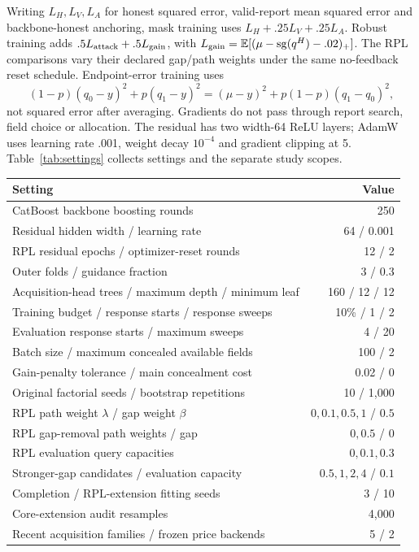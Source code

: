 \documentclass[11pt]{article}
\begin{document}
Writing $L_H,L_V,L_A$ for honest squared error, valid-report mean squared
error and backbone-honest anchoring, mask training uses
$L_H+.25L_V+.25L_A$. Robust training adds
$.5L_{\rm attack}+.5L_{\rm gain}$, with
$L_{\rm gain}=\mathbb E[(\mu-\operatorname{sg}(q^H)-.02)_+]$.
The RPL comparisons vary their declared gap/path weights under the same
no-feedback reset schedule. Endpoint-error training uses
\[
 (1-p)(q_0-y)^2+p(q_1-y)^2
 =(\mu-y)^2+p(1-p)(q_1-q_0)^2,
\]
not squared error after averaging. Gradients do not pass through report search,
field choice or allocation. The residual has two width-64 ReLU layers; AdamW
uses learning rate .001, weight decay $10^{-4}$ and gradient clipping at 5.
Table~\ref{tab:settings} collects settings and the separate study scopes.

\begin{table}[htbp]\centering\small
\begin{tabular}{lr}\toprule
Setting & Value\\\midrule
CatBoost backbone boosting rounds ~\cite{catboost} & 250\\
Residual hidden width / learning rate & 64 / 0.001\\
RPL residual epochs / optimizer-reset rounds & 12 / 2\\
Outer folds / guidance fraction & 3 / 0.3\\
Acquisition-head trees / maximum depth / minimum leaf & 160 / 12 / 12\\
Training budget / response starts / response sweeps & 10\% / 1 / 2\\
Evaluation response starts / maximum sweeps & 4 / 20\\
Batch size / maximum concealed available fields & 100 / 2\\
Gain-penalty tolerance / main concealment cost & 0.02 / 0\\
Original factorial seeds / bootstrap repetitions & 10 / 1,000\\
RPL path weight $\lambda$ / gap weight $\beta$ & $0,0.1,0.5,1$ / $0.5$\\
RPL gap-removal path weights / gap & $0,0.5$ / $0$\\
RPL evaluation query capacities & $0,0.1,0.3$\\
Stronger-gap candidates / evaluation capacity & $0.5,1,2,4$ / $0.1$\\
Completion / RPL-extension fitting seeds & 3 / 10\\
Core-extension audit resamples & 4,000\\
Recent acquisition families / frozen price backends & 5 / 2\\

\end{tabular}
\end{table}
\end{document}
